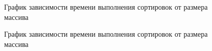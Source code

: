 \documentclass[a4paper,12pt]{article}
\begin{document}
\begin{figure}[h]
\caption{График зависимости времени выполнения сортировок от размера массива}
\label{images:graphics1}
\end{figure}
\begin{figure}[H]
\caption{График зависимости времени выполнения сортировок от размера массива}
\label{images:graphics2}
\end{figure}
\end{document}
